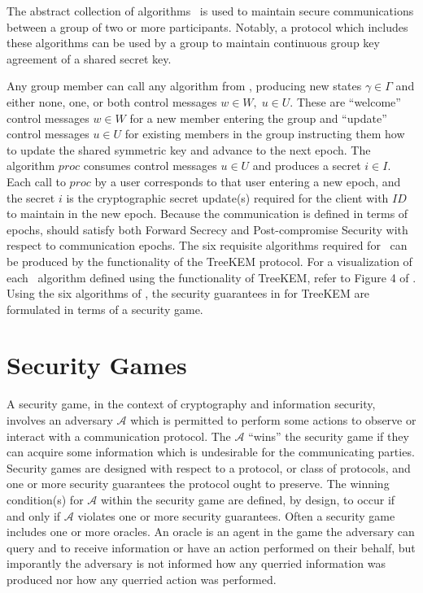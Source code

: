 The abstract collection of algorithms \CGKAdef\ is used to maintain secure communications between a group of two or more participants.
Notably, a protocol which includes these algorithms can be used by a group to maintain continuous group key agreement of a shared secret key.

Any group member can call any algorithm from \CGKAdef, producing new states \(\gamma \in \Gamma\) and either none, one, or both control messages \(w \in W,\; u \in U\).
These are ``welcome'' control messages \(w \in W\) for a new member entering the group and ``update'' control messages \(u \in U\) for existing members in the group instructing them how to update the shared symmetric key and advance to the next epoch.
The algorithm \(proc\) consumes control messages \(u \in U\) and produces a secret \(i \in I\).
Each call to \(proc\) by a user corresponds to that user entering a new epoch, and the secret \(i\) is the cryptographic secret update(s) required for the client with \(ID\) to maintain  in the new epoch.
Because the communication is defined in terms of epochs,  should satisfy both Forward Secrecy and Post-compromise Security with respect to communication epochs.
The six requisite algorithms required for \CGKAdef\ can be produced by the functionality of the TreeKEM protocol.
For a visualization of each \CGKAdef\ algorithm defined using the functionality of TreeKEM, refer to Figure 4 of \autocite{alwen2020security}.
Using the six algorithms of \CGKAdef, the security guarantees in for TreeKEM are formulated in terms of a security game.


\hypertarget{sec:security-games}{%
\section{Security Games}\label{sec:security-games}}

A security game, in the context of cryptography and information security, involves an adversary \(\mathcal{A}\) which is permitted to perform some actions to observe or interact with a communication protocol.
The \(\mathcal{A}\) ``wins'' the security game if they can acquire some information which is undesirable for the communicating parties.
Security games are designed with respect to a protocol, or class of protocols, and one or more security guarantees the protocol ought to preserve.
The winning condition(s) for \(\mathcal{A}\) within the security game are defined, by design, to occur if and only if \(\mathcal{A}\) violates one or more security guarantees.
Often a security game includes one or more oracles.
An oracle is an agent in the game the adversary can query and to receive information or have an action performed on their behalf, but imporantly the adversary is not informed how any querried information was produced nor how any querried action was performed.


